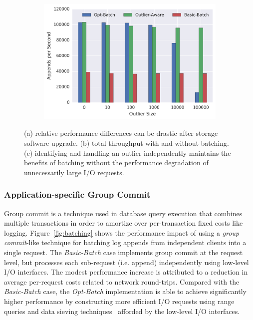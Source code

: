 \begin{figure}[t]
\begin{subfigure}[b]{.33\linewidth}
        \includegraphics[width=1.0\linewidth]{batching-outlier-detect.png}
        \caption{}
        \label{fig:batching-outlier}
    \end{subfigure}
    \caption{(a) relative performance differences can be drastic after storage
    software upgrade. (b) total throughput with and without batching.  (c)
    identifying and handling an outlier independently maintains the benefits
    of batching without the performance degradation of unnecessarily large I/O
    requests.}
\end{figure}

\subsubsection{Application-specific Group Commit}

Group commit is a technique used in database query execution that combines
multiple transactions in order to amortize over per-transaction fixed costs
like logging. Figure~\ref{fig:batching} shows the performance impact of using
a \emph{group commit}-like technique for batching log appends from independent
clients into a single request.  The \emph{Basic-Batch} case implements group
commit at the request level, but processes each sub-request (i.e.  append)
independently using low-level I/O interfaces. The modest performance increase
is attributed to a reduction in average per-request costs related to network
round-trips. Compared with the \emph{Basic-Batch} case, the \emph{Opt-Batch}
implementation is able to achieve significantly higher performance by
constructing more efficient I/O requests using range queries and data sieving
techniques~\cite{x} afforded by the low-level I/O interfaces.

